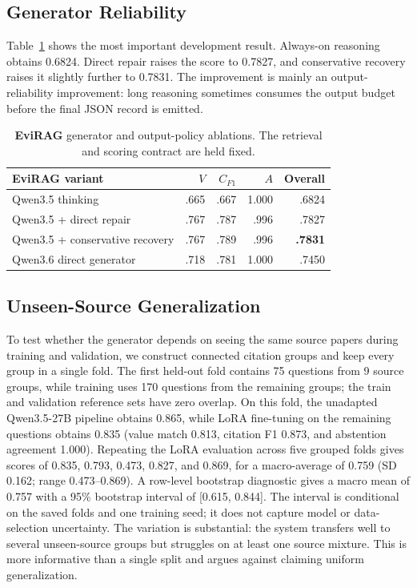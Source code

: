 \documentclass[11pt]{article}
\newcommand{\method}{\textbf{EviRAG}}
\begin{document}
\subsection{Generator Reliability}
Table~\ref{tab:generator} shows the most important development result. Always-on reasoning obtains 0.6824. Direct repair raises the score to 0.7827, and conservative recovery raises it slightly further to 0.7831. The improvement is mainly an output-reliability improvement: long reasoning sometimes consumes the output budget before the final JSON record is emitted.

\begin{table}[t]
\centering
\scriptsize
\begin{tabular}{lrrrr}
\toprule
\method{} variant & $V$ & $C_{F1}$ & $A$ & Overall \\
\midrule
Qwen3.5 thinking & .665 & .667 & 1.000 & .6824 \\
Qwen3.5 + direct repair & .767 & .787 & .996 & .7827 \\
Qwen3.5 + conservative recovery & .767 & .789 & .996 & \textbf{.7831} \\
Qwen3.6 direct generator & .718 & .781 & 1.000 & .7450 \\
\bottomrule
\end{tabular}
\caption{\method{} generator and output-policy ablations. The retrieval and scoring contract are held fixed.}
\label{tab:generator}
\end{table}

\subsection{Unseen-Source Generalization}
To test whether the generator depends on seeing the same source papers during training and validation, we construct connected citation groups and keep every group in a single fold. The first held-out fold contains 75 questions from 9 source groups, while training uses 170 questions from the remaining groups; the train and validation reference sets have zero overlap. On this fold, the unadapted Qwen3.5-27B pipeline obtains 0.865, while LoRA fine-tuning on the remaining questions obtains 0.835 (value match 0.813, citation F1 0.873, and abstention agreement 1.000). Repeating the LoRA evaluation across five grouped folds gives scores of 0.835, 0.793, 0.473, 0.827, and 0.869, for a macro-average of 0.759 (SD 0.162; range 0.473--0.869). A row-level bootstrap diagnostic gives a macro mean of 0.757 with a 95\% bootstrap interval of [0.615, 0.844]. The interval is conditional on the saved folds and one training seed; it does not capture model or data-selection uncertainty. The variation is substantial: the system transfers well to several unseen-source groups but struggles on at least one source mixture. This is more informative than a single split and argues against claiming uniform generalization.
\end{document}
